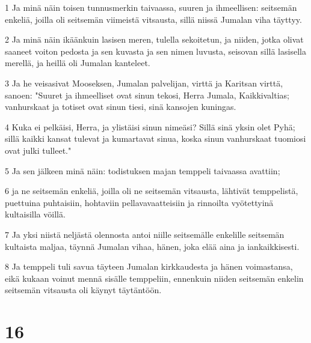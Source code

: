 \par 1 Ja minä näin toisen tunnusmerkin taivaassa, suuren ja ihmeellisen: seitsemän enkeliä, joilla oli seitsemän viimeistä vitsausta, sillä niissä Jumalan viha täyttyy.
\par 2 Ja minä näin ikäänkuin lasisen meren, tulella sekoitetun, ja niiden, jotka olivat saaneet voiton pedosta ja sen kuvasta ja sen nimen luvusta, seisovan sillä lasisella merellä, ja heillä oli Jumalan kanteleet.
\par 3 Ja he veisasivat Mooseksen, Jumalan palvelijan, virttä ja Karitsan virttä, sanoen: "Suuret ja ihmeelliset ovat sinun tekosi, Herra Jumala, Kaikkivaltias; vanhurskaat ja totiset ovat sinun tiesi, sinä kansojen kuningas.
\par 4 Kuka ei pelkäisi, Herra, ja ylistäisi sinun nimeäsi? Sillä sinä yksin olet Pyhä; sillä kaikki kansat tulevat ja kumartavat sinua, koska sinun vanhurskaat tuomiosi ovat julki tulleet."
\par 5 Ja sen jälkeen minä näin: todistuksen majan temppeli taivaassa avattiin;
\par 6 ja ne seitsemän enkeliä, joilla oli ne seitsemän vitsausta, lähtivät temppelistä, puettuina puhtaisiin, hohtaviin pellavavaatteisiin ja rinnoilta vyötettyinä kultaisilla vöillä.
\par 7 Ja yksi niistä neljästä olennosta antoi niille seitsemälle enkelille seitsemän kultaista maljaa, täynnä Jumalan vihaa, hänen, joka elää aina ja iankaikkisesti.
\par 8 Ja temppeli tuli savua täyteen Jumalan kirkkaudesta ja hänen voimastansa, eikä kukaan voinut mennä sisälle temppeliin, ennenkuin niiden seitsemän enkelin seitsemän vitsausta oli käynyt täytäntöön.

\chapter{16}

